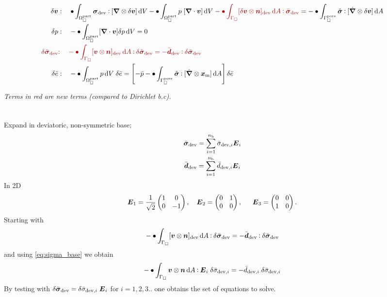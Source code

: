 \documentclass[a4paper]{article}
\newcommand{\pore}{\mathrm{pore}}
\newcommand{\particle}{\mathrm{part}}
\newcommand{\highlight}[1]{{\color{red!70!black}#1}}
\begin{document}
\begin{align}
 \delta\ta v &:\quad 
 \bullet \int_{\Omega_\Box^\particle} \ts\sigma_\dev \dprod [\diff\outerp\delta\ta v]\dif V - \bullet\int_{\Omega_\Box^\particle} p\;[\diff\cdot \ta v] \dif V 
  \;\highlight{-\bullet \int_{\Gamma_\Box} [\delta\ta v\outerp\ta n]_\dev\dif A\dprod \bar{\ts\sigma}_\dev}
  = -\bullet\int_{\Gamma_\Box^\pore} \hat{\ts\sigma} \dprod [\hat{\diff}\outerp\delta\ta v]\dif A
 \\
 \delta p &:\quad 
 -\bullet \int_{\Omega_\Box^\particle} [\diff\cdot\ta v] \delta p\dif V = 0
 \\
 \highlight{\delta\bar{\ts\sigma}_\dev  }&\highlight{:\quad
 -\bullet \int_{\Gamma_\Box} [\ta v\outerp\ta n]_\dev\dif A \dprod \delta\bar{\ts\sigma}_\dev = -\bar{\ts d}_\dev \dprod \delta\bar{\ts\sigma}_\dev
 }
 \\
 \delta\bar{e} &:\quad 
 -\bullet\int_{\Omega_\Box^\particle} p\dif V\;\delta\bar{e}  = \left[-\bar{p} -\bullet\int_{\Gamma_\Box^\pore} \hat{\ts\sigma}\dprod[\hat{\diff}\outerp\ta x_\mean]\dif A\right]\delta\bar{e} 
\end{align}

\emph{Terms in red are new terms (compared to Dirichlet b.c).}
\newpage

\section{}
Expand in deviatoric, non-symmetric base;
\begin{gather}
 \bar{\boldsymbol{\sigma}}_{\mathrm{dev}} = \sum_{i=1}^{n_{\mathrm{b}}} \bar{\sigma}_{\mathrm{dev},i} \boldsymbol{E}_i
\label{eq:sigma_base} \\
 \bar{\boldsymbol{d}}_{\mathrm{dev}} = \sum_{i=1}^{n_{\mathrm{b}}} \bar{d}_{\mathrm{dev},i} \boldsymbol{E}_i
\label{eq:d_base} \\
\end{gather}
In 2D
\begin{align}
 \boldsymbol{E}_1 = \frac{1}{\sqrt{2}}\begin{pmatrix}1 & 0 \\ 0 & -1\end{pmatrix}, \quad
 \boldsymbol{E}_2 = \begin{pmatrix}0 & 1 \\ 0 & 0\end{pmatrix},\;\quad\;
 \boldsymbol{E}_3 = \begin{pmatrix}0 & 0 \\ 1 & 0\end{pmatrix}.
\end{align}
Starting with
\begin{gather}
 -\bullet\int_{\Gamma_\Box} [\boldsymbol{v} \mathbin{\otimes} \boldsymbol{n}]_{\mathrm{dev}} \operatorname{d \!} A \mathbin{\vcentcolon} \delta\bar{\boldsymbol{\sigma}}_{\mathrm{dev}} = -\bar{\boldsymbol{d}}_{\mathrm{dev}} \mathbin{\vcentcolon} \delta\bar{\boldsymbol{\sigma}}_{\mathrm{dev}}
\end{gather}
and using \eqref{eq:sigma_base} we obtain
\begin{gather}
 -\bullet\int_{\Gamma_\Box} \boldsymbol{v} \mathbin{\otimes} \boldsymbol{n} \operatorname{d \!} A \mathbin{\vcentcolon} \boldsymbol{E}_i \;\delta\bar{\sigma}_{\mathrm{dev},i} = -\bar{d}_{\mathrm{dev},i} \;\delta\bar{\sigma}_{\mathrm{dev},i} 
\end{gather}
By testing with $\delta\bar{\boldsymbol{\sigma}}_{\mathrm{dev}} = \delta\bar{\sigma}_{\mathrm{dev},i}\;\boldsymbol{E}_i$ for $i = 1,2,3..$ one obtains the set of equations to solve.
\end{document}
